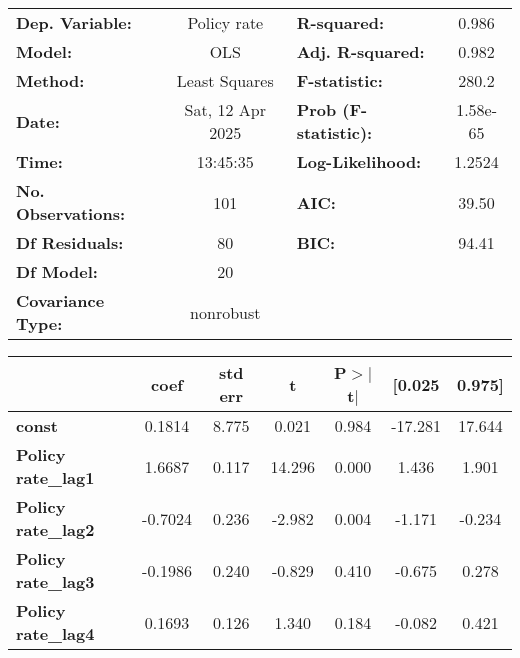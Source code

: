 \begin{center}
\begin{tabular}{lclc}
\toprule
\textbf{Dep. Variable:}         &   Policy rate    & \textbf{  R-squared:         } &     0.986   \\
\textbf{Model:}                 &       OLS        & \textbf{  Adj. R-squared:    } &     0.982   \\
\textbf{Method:}                &  Least Squares   & \textbf{  F-statistic:       } &     280.2   \\
\textbf{Date:}                  & Sat, 12 Apr 2025 & \textbf{  Prob (F-statistic):} &  1.58e-65   \\
\textbf{Time:}                  &     13:45:35     & \textbf{  Log-Likelihood:    } &    1.2524   \\
\textbf{No. Observations:}      &         101      & \textbf{  AIC:               } &     39.50   \\
\textbf{Df Residuals:}          &          80      & \textbf{  BIC:               } &     94.41   \\
\textbf{Df Model:}              &          20      & \textbf{                     } &             \\
\textbf{Covariance Type:}       &    nonrobust     & \textbf{                     } &             \\
\bottomrule
\end{tabular}
\begin{tabular}{lcccccc}
                                & \textbf{coef} & \textbf{std err} & \textbf{t} & \textbf{P$> |$t$|$} & \textbf{[0.025} & \textbf{0.975]}  \\
\midrule
\textbf{const}                  &       0.1814  &        8.775     &     0.021  &         0.984        &      -17.281    &       17.644     \\
\textbf{Policy rate\_lag1}      &       1.6687  &        0.117     &    14.296  &         0.000        &        1.436    &        1.901     \\
\textbf{Policy rate\_lag2}      &      -0.7024  &        0.236     &    -2.982  &         0.004        &       -1.171    &       -0.234     \\
\textbf{Policy rate\_lag3}      &      -0.1986  &        0.240     &    -0.829  &         0.410        &       -0.675    &        0.278     \\
\textbf{Policy rate\_lag4}      &       0.1693  &        0.126     &     1.340  &         0.184        &       -0.082    &        0.421     \\

\end{tabular}
\end{center}
